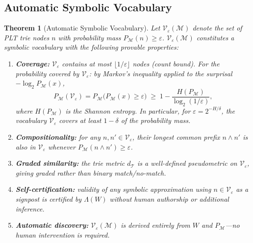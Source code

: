 \documentclass[11pt]{article}
\newtheorem{theorem}{Theorem}
\begin{document}
\subsection{Automatic Symbolic Vocabulary}

\begin{theorem}[Automatic Symbolic Vocabulary]
\label{thm:symbolic}
Let $\mathcal{V}_\varepsilon(\mathcal{M})$ denote the set of PLT trie nodes
$n$ with probability mass $P_{\mathcal{M}}(n) \geq \varepsilon$.
$\mathcal{V}_\varepsilon(\mathcal{M})$ constitutes a \emph{symbolic vocabulary}
with the following provable properties:
\begin{enumerate}[leftmargin=2em,label=(\alph*)]
  \item \textbf{Coverage:} $\mathcal{V}_\varepsilon$ contains at most
        $\lfloor 1/\varepsilon \rfloor$ nodes (count bound).  For the
        probability covered by $\mathcal{V}_\varepsilon$: by Markov's inequality
        applied to the surprisal $-\log_2 P_{\mathcal{M}}(x)$,
        \[
          P_{\mathcal{M}}(\mathcal{V}_\varepsilon)
          = P_{\mathcal{M}}\!\bigl(P_{\mathcal{M}}(x) \geq \varepsilon\bigr)
          \;\geq\; 1 - \frac{H(P_{\mathcal{M}})}{\log_2(1/\varepsilon)},
        \]
        where $H(P_{\mathcal{M}})$ is the Shannon entropy.  In particular, for
        $\varepsilon = 2^{-H/\delta}$, the vocabulary $\mathcal{V}_\varepsilon$
        covers at least $1 - \delta$ of the probability mass.
  \item \textbf{Compositionality:} for any $n, n' \in \mathcal{V}_\varepsilon$,
        their longest common prefix $n \wedge n'$ is also in $\mathcal{V}_\varepsilon$
        whenever $P_{\mathcal{M}}(n \wedge n') \geq \varepsilon$.
  \item \textbf{Graded similarity:} the trie metric $d_{\mathcal{T}}$ is a
        well-defined pseudometric on $\mathcal{V}_\varepsilon$, giving graded
        rather than binary match/no-match.
  \item \textbf{Self-certification:} validity of any symbolic approximation
        using $n \in \mathcal{V}_\varepsilon$ as a signpost is certified by
        $\Lambda(W)$ without human authorship or additional inference.
  \item \textbf{Automatic discovery:} $\mathcal{V}_\varepsilon(\mathcal{M})$
        is derived entirely from $W$ and $P_{\mathcal{M}}$---no human
        intervention is required.
\end{enumerate}
\end{theorem}
\end{document}
